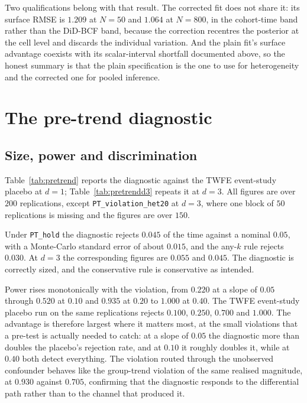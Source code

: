 \documentclass[11pt]{article}
\begin{document}
Two qualifications belong with that result. The corrected fit does not share
it: its surface RMSE is $1.209$ at $N=50$ and $1.064$ at $N=800$, in the
cohort-time band rather than the DiD-BCF band, because the correction
recentres the posterior at the cell level and discards the individual
variation. And the plain fit's surface advantage coexists with its
scalar-interval shortfall documented above, so the honest summary is that the
plain specification is the one to use for heterogeneity and the corrected one
for pooled inference.



\section{The pre-trend diagnostic}

\subsection{Size, power and discrimination}

Table~\ref{tab:pretrend} reports the diagnostic against the TWFE event-study
placebo at $d=1$; Table~\ref{tab:pretrendd3} repeats it at $d=3$. All figures
are over $200$ replications, except \texttt{PT\_violation\_het20} at $d=3$,
where one block of $50$ replications is missing and the figures are over $150$.

Under \texttt{PT\_hold} the diagnostic rejects $0.045$ of the time against a
nominal $0.05$, with a Monte-Carlo standard error of about $0.015$, and the
any-$k$ rule rejects $0.030$. At $d=3$ the corresponding figures are $0.055$
and $0.045$. The diagnostic is correctly sized, and the conservative rule is
conservative as intended.

Power rises monotonically with the violation, from $0.220$ at a slope of
$0.05$ through $0.520$ at $0.10$ and $0.935$ at $0.20$ to $1.000$ at $0.40$.
The TWFE event-study placebo run on the same replications rejects $0.100$,
$0.250$, $0.700$ and $1.000$. The advantage is therefore largest where it
matters most, at the small violations that a pre-test is actually needed to
catch: at a slope of $0.05$ the diagnostic more than doubles the placebo's
rejection rate, and at $0.10$ it roughly doubles it, while at $0.40$ both
detect everything. The violation routed through the unobserved confounder
behaves like the group-trend violation of the same realised magnitude, at
$0.930$ against $0.705$, confirming that the diagnostic responds to the
differential path rather than to the channel that produced it.
\end{document}
